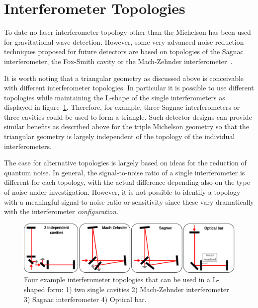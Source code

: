 \FloatBarrier
\section{Interferometer Topologies }\label{sec:topologies} 
To date no laser interferometer topology other than the Michelson has been
used for gravitational wave detection. However, some very advanced
noise reduction techniques proposed for future 
detectors are based on topologies of the Sagnac interferometer, the Fox-Smith cavity or the
Mach-Zehnder interferometer~\cite{Chen03,danilishin2006,Chen06b}.

It is worth noting that a triangular geometry as discussed above
is conceivable with different interferometer
topologies. In particular it is possible to use different
topologies while maintaining the {\sf L}-shape of the single
interferometers
as displayed in figure~\ref{fig:Lshapes}.
Therefore, for example, three Sagnac interferometers or three cavities
could be used to form a triangle.
Such detector designs can provide similar benefits as described above for the 
triple Michelson geometry so that the triangular geometry is largely independent 
of the topology of the individual interferometers. 

The case for alternative topologies is largely based on ideas for the
reduction of quantum noise. In general, the signal-to-noise ratio of a 
single interferometer is different for each topology, with the actual
difference depending also on the type of noise under investigation.
However, it is not possible to identify a topology with a meaningful 
signal-to-noise ratio or sensitivity since these vary dramatically
with the interferometer \emph{configuration}. 
\begin{figure}[thb] 
\centering 
\includegraphics[width=\textwidth]{topologies2}
\caption{Four example interferometer topologies that can be used in a {\sf L}-shaped form: 1) two single cavities
2) Mach-Zehnder interferometer 3) Sagnac interferometer 4) Optical bar.}
\label{fig:Lshapes} 
\end{figure}

